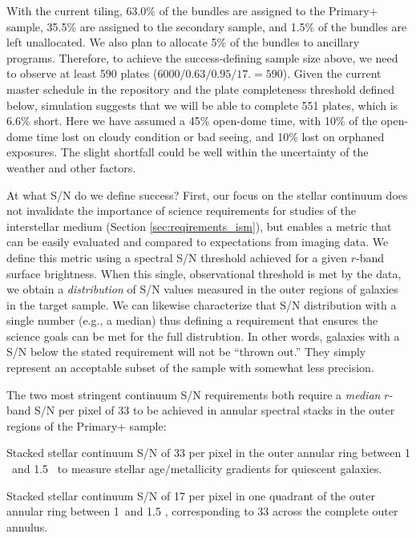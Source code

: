 \documentclass[11pt,a4paper,twoside,onecolumn,openany,final,oldfontcommands]{memoir}
\begin{document}
With the current tiling, 63.0\% of the bundles are assigned to the Primary+ sample, 35.5\% are assigned to the secondary sample, and 1.5\% of the bundles are left unallocated. We also plan to allocate 5\% of the bundles to ancillary programs. Therefore, to achieve the success-defining sample size above, we need to observe at least 590 plates ($6000/0.63/0.95/17.= 590$). Given the current master schedule in the repository and the plate completeness threshold defined below, simulation suggests that we will be able to complete 551 plates, which is 6.6\% short. Here we have assumed a 45\% open-dome time, with 10\% of the open-dome time lost on cloudy condition or bad seeing, and 10\% lost on orphaned exposures. The slight shortfall could be well within the uncertainty of the weather and other factors. 

At what S/N do we define success? First, our focus on the stellar continuum does not invalidate the importance of science requirements for studies of the interstellar medium (Section \ref{sec:reqirements_ism}), but enables a metric that can be easily evaluated and compared to expectations from imaging data.  We define this metric using a spectral S/N threshold achieved for a given $r$-band surface brightness.  When this single, observational threshold is met by the data, we obtain a {\em distribution} of S/N values measured in the outer regions of galaxies in the target sample. We can likewise characterize that S/N distribution with a single number (e.g., a median) thus defining a requirement that ensures the science goals can be met for the full distrubtion.  In other words, galaxies with a S/N below the stated requirement will not be ``thrown out.''  They simply represent an acceptable subset of the sample with somewhat less precision.

The two most stringent continuum S/N requirements both require a {\em median} $r$-band S/N per pixel of 33 to be achieved in annular spectral stacks in the outer regions of the Primary+ sample:

\begin{requirement}

\reqitem Stacked stellar continuum S/N of 33 per pixel in the outer annular ring between 1 \Reff\ and 1.5 \Reff\ to measure stellar age/metallicity gradients for quiescent galaxies.
    
\reqitem Stacked stellar continuum S/N of 17 per pixel in one quadrant of the outer annular ring between 1\Reff\ and 1.5 \Reff, corresponding to 33 across the complete outer annulus.

\end{requirement}
\end{document}
